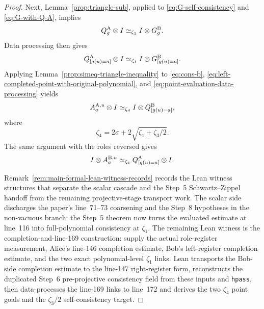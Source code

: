 \begin{proof}
	Next, Lemma~\ref{prop:triangle-sub}, applied to \ref{eq:G-self-consistency} and \ref{eq:G-with-Q-A}, implies
	\[
		Q_g^{\mathrm A} \otimes I \simeq_{\zeta_1} I \otimes G_g^{\mathrm B}.
	\]
	Data processing then gives
	\begin{equation}\label{eq:left-completed-point-with-original-polynomial}
		Q_{[g(u)=a]}^{\mathrm A} \otimes I \simeq_{\zeta_1} I \otimes G_{[g(u)=a]}^{\mathrm B}.
	\end{equation}
	Applying Lemma~\ref{prop:simeq-triangle-inequality} to \ref{eq:cons-b}, \ref{eq:left-completed-point-with-original-polynomial}, and \ref{eq:point-evaluation-data-processing} yields
	\begin{equation}\label{eq:final-left-point-consistency}
		A_a^{\mathrm A,u} \otimes I \simeq_{\zeta_4} I \otimes Q_{[g(u)=a]}^{\mathrm B},
	\end{equation}
	where
	\[
		\zeta_4 = 2\sigma + 2\sqrt{\zeta_1+\zeta_3/2}.
	\]
	The same argument with the roles reversed gives
	\begin{equation}\label{eq:final-right-point-consistency}
		I \otimes A_a^{\mathrm B,u} \simeq_{\zeta_4} Q_{[g(u)=a]}^{\mathrm A} \otimes I.
	\end{equation}

	Remark~\ref{rem:main-formal-lean-witness-records} records the Lean witness
	structures that separate the scalar cascade and the Step~5 Schwartz--Zippel
	handoff from the remaining projective-stage transport work.  The scalar side
	discharges the paper's line~71--73 coarsening and the Step~8 hypotheses in the
	non-vacuous branch; the Step~5 theorem now turns the evaluated estimate at
	line~116 into full-polynomial consistency at $\zeta_1$.  The remaining Lean
	witness is the completion-and-line-169 construction: supply the actual
	role-register measurement, Alice's line-146 completion estimate, Bob's
	left-register completion estimate, and the two exact polynomial-level
	$\zeta_1$ links.  Lean transports the Bob-side completion estimate to the
	line-147 right-register form, reconstructs the duplicated Step~6 pre-projective
	consistency field from these inputs and \texttt{hpass}, then data-processes the
	line-169 links to line~172 and derives the two $\zeta_4$ point goals and the
	$\zeta_3/2$ self-consistency target.


\end{proof}
